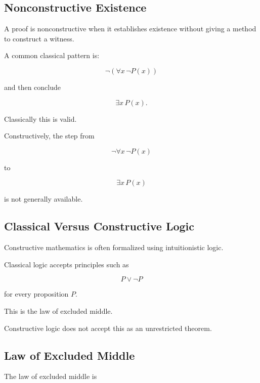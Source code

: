 \subsection{Nonconstructive Existence}
\label{subsec:nonconstructive-existence}

A proof is nonconstructive when it establishes existence without giving a
method to construct a witness.

A common classical pattern is:

\[
\boxed{
\neg
\left(
\forall x\,\neg P(x)
\right)
}
\]

and then conclude

\[
\boxed{
\exists x\,P(x).
}
\]

Classically this is valid.

Constructively, the step from

\[
\neg\forall x\,\neg P(x)
\]

to

\[
\exists x\,P(x)
\]

is not generally available.

\subsection{Classical Versus Constructive Logic}
\label{subsec:classical-versus-constructive-logic}

Constructive mathematics is often formalized using intuitionistic logic.

Classical logic accepts principles such as

\[
\boxed{
P\lor\neg P
}
\]

for every proposition \(P\).

This is the law of excluded middle.

Constructive logic does not accept this as an unrestricted theorem.

\subsection{Law of Excluded Middle}
\label{subsec:constructive-excluded-middle}

The law of excluded middle is

